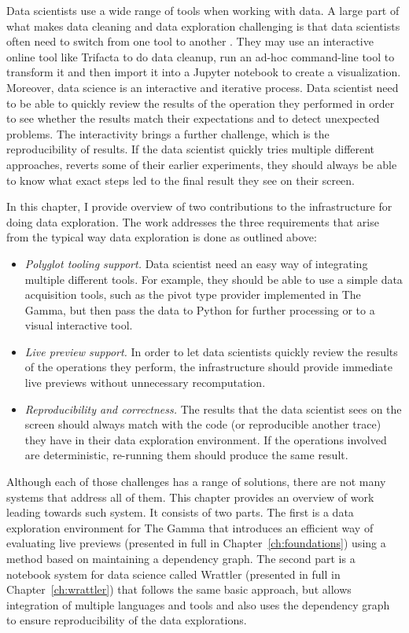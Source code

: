 \documentclass[fleqn,11pt]{report}
\theoremstyle{definition}
\newenvironment{nitemize}
{ \vspace{-0.4em}
  \begin{itemize}
    \setlength{\itemsep}{5pt}
    \setlength{\parskip}{0pt}
    \setlength{\parsep}{0pt} }
{ \end{itemize}
  \vspace{-0.4em} }
\begin{document}
Data scientists use a wide range of tools when working with data. A large part of what makes
data cleaning and data exploration challenging is that data scientists often need to switch
from one tool to another \citep{rattenbury-2017-wrangling}. They may use an interactive online
tool like Trifacta to do data cleanup, run an ad-hoc command-line tool to
transform it and then import it into a Jupyter notebook to create a visualization. Moreover,
data science is an interactive and iterative process. Data scientist need to be able to quickly
review the results of the operation they performed in order to see whether the results match
their expectations and to detect unexpected problems. The interactivity brings a further challenge,
which is the reproducibility of results. If the data scientist quickly tries multiple different
approaches, reverts some of their earlier experiments, they should always be able to know what
exact steps led to the final result they see on their screen.

In this chapter, I provide overview of two contributions to the infrastructure for doing data
exploration. The work addresses the three requirements that arise from the typical way data
exploration is done as outlined above:

\begin{nitemize}
\item \emph{Polyglot tooling support.} Data scientist need an easy way of integrating multiple
  different tools. For example, they should be able to use a simple data acquisition tools,
  such as the pivot type provider implemented in The Gamma, but then pass the data to Python
  for further processing or to a visual interactive tool.

\item \emph{Live preview support.} In order to let data scientists quickly review the results
  of the operations they perform, the infrastructure should provide immediate live previews
  without unnecessary recomputation.

\item \emph{Reproducibility and correctness.} The results that the data scientist sees on the
  screen should always match with the code (or reproducible another trace) they have in their
  data exploration environment. If the operations involved are deterministic, re-running them
  should produce the same result.
\end{nitemize}

Although each of those challenges has a range of solutions, there are not many systems that
address all of them. This chapter provides an overview of work leading towards such system.
It consists of two parts. The first is a data exploration environment for The Gamma that introduces
an efficient way of evaluating live previews (presented in full in Chapter~\ref{ch:foundations})
using a method based on maintaining a dependency graph. The second part is a notebook system for
data science called Wrattler (presented in full in Chapter~\ref{ch:wrattler}) that
follows the same basic approach, but allows integration of multiple languages and tools and also
uses the dependency graph to ensure reproducibility of the data explorations.
\end{document}

